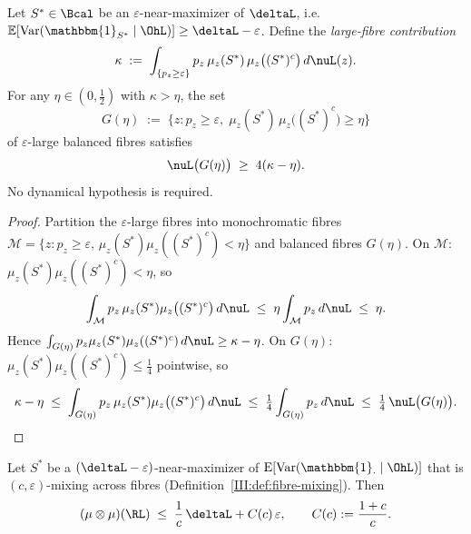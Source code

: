 \begin{lemma}
\label{III:lem:balance}
Let $S^* \in \Bcal$ be an $\varepsilon$-near-maximizer of $\deltaL$, i.e.\
$\mathbb{E}[\mathrm{Var}(\mathbbm{1}_{S^*} \mid \OhL)] \geq \deltaL - \varepsilon$.
Define the \emph{large-fibre contribution}
\[
  \kappa \;:=\; \int_{\{p_z \geq \varepsilon\}}
    p_z\,\mu_z(S^*)\,\mu_z\bigl((S^*)^c\bigr)\,d\nuL(z).
\]
For any $\eta \in (0,\tfrac{1}{2})$ with $\kappa > \eta$, the set
\[
  G(\eta) \;:=\; \bigl\{z : p_z \geq \varepsilon,\;
    \mu_z(S^*)\,\mu_z\bigl((S^*)^c\bigr) \geq \eta\bigr\}
\]
of $\varepsilon$-large balanced fibres satisfies
\[
  \nuL\bigl(G(\eta)\bigr) \;\geq\; 4(\kappa - \eta).
\]
No dynamical hypothesis is required.
\end{lemma}

\begin{proof}
Partition the $\varepsilon$-large fibres into monochromatic fibres
$\mathcal{M} = \{z : p_z \geq \varepsilon,\, \mu_z(S^*)\mu_z((S^*)^c) < \eta\}$
and balanced fibres $G(\eta)$.
On $\mathcal{M}$: $\mu_z(S^*)\mu_z((S^*)^c) < \eta$, so
\[
  \int_{\mathcal{M}} p_z\,\mu_z(S^*)\mu_z\bigl((S^*)^c\bigr)\,d\nuL
  \;\leq\; \eta\int_{\mathcal{M}} p_z\,d\nuL \;\leq\; \eta.
\]
Hence $\int_{G(\eta)} p_z\mu_z(S^*)\mu_z((S^*)^c)\,d\nuL \geq \kappa - \eta$.
On $G(\eta)$: $\mu_z(S^*)\mu_z((S^*)^c) \leq \tfrac{1}{4}$ pointwise, so
\[
  \kappa - \eta
  \;\leq\; \int_{G(\eta)} p_z\,\mu_z(S^*)\mu_z\bigl((S^*)^c\bigr)\,d\nuL
  \;\leq\; \tfrac{1}{4}\int_{G(\eta)} p_z\,d\nuL
  \;\leq\; \tfrac{1}{4}\,\nuL\bigl(G(\eta)\bigr). \qedhere
\]
\end{proof}

\begin{lemma}
\label{III:lem:hard}
Let $S^*$ be a $(\deltaL - \varepsilon)$-near-maximizer of
$\mathrm{E}[\mathrm{Var}(\mathbbm{1}_{\cdot}\mid\OhL)]$ that is
$(c,\varepsilon)$-mixing across fibres
(Definition~\ref{III:def:fibre-mixing}).
Then
\[
  (\mu\otimes\mu)(\RL) \;\leq\; \frac{1}{c}\,\deltaL + C(c)\,\varepsilon,
  \qquad C(c) := \frac{1+c}{c}.
\]
\end{lemma}


